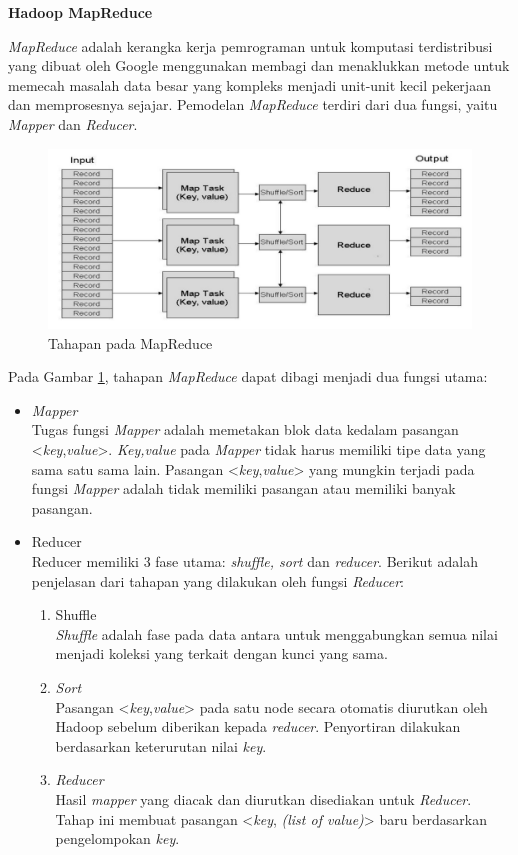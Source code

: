 \documentclass[a4paper,twoside]{article}
\begin{document}
\begin{enumerate}
\textbf{Hadoop MapReduce}

\textit{MapReduce} adalah kerangka kerja pemrograman untuk komputasi terdistribusi yang dibuat oleh Google menggunakan membagi dan menaklukkan metode untuk memecah masalah data besar yang kompleks menjadi unit-unit kecil pekerjaan dan memprosesnya sejajar. Pemodelan \textit{MapReduce} terdiri dari dua fungsi, yaitu \textit{Mapper} dan \textit{Reducer}. 

\begin{figure}[H]
	\centering
	\includegraphics[scale=0.36]{MapReduceImage}
	\caption{Tahapan pada MapReduce}
	\label{fig:MapReduceImage}
\end{figure}

\noindent Pada Gambar \ref{fig:MapReduceImage}, tahapan \textit{MapReduce} dapat dibagi menjadi dua fungsi utama:

\begin{itemize}
\item \textit{Mapper}\\
Tugas fungsi \textit{Mapper} adalah memetakan blok data kedalam pasangan <\textit{key},\textit{value}>. \textit{Key,value} pada \textit{Mapper} tidak harus memiliki tipe data yang sama satu sama lain. Pasangan <\textit{key},\textit{value}> yang mungkin terjadi pada fungsi \textit{Mapper} adalah tidak memiliki pasangan atau memiliki banyak pasangan.

\item Reducer\\
Reducer memiliki 3 fase utama: \textit{shuffle, sort} dan \textit{reducer}. Berikut adalah penjelasan dari tahapan yang dilakukan oleh fungsi \textit{Reducer}:

\begin{enumerate}
\item Shuffle \\
\textit{Shuffle} adalah fase pada data antara untuk menggabungkan semua nilai menjadi koleksi yang terkait dengan kunci yang sama.
\item \textit{Sort} \\
Pasangan <\textit{key},\textit{value}> pada satu node secara otomatis diurutkan oleh Hadoop sebelum diberikan kepada \textit{reducer}. Penyortiran dilakukan berdasarkan keterurutan nilai \textit{key}. 
\item \textit{Reducer} \\
Hasil \textit{mapper} yang diacak dan diurutkan disediakan untuk \textit{Reducer}. Tahap ini membuat pasangan <\textit{key}, \textit{(list of value)}> baru berdasarkan pengelompokan \textit{key}.
\end{enumerate}


\end{itemize}
\end{enumerate}
\end{document}
